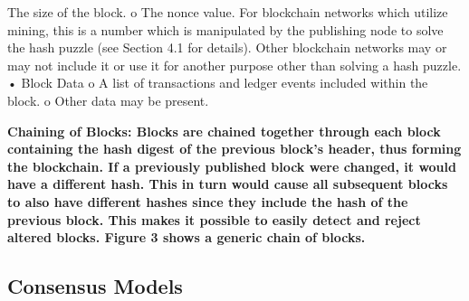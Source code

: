 The size of the block.
o The nonce value. For blockchain networks which utilize mining, this is a number
which is manipulated by the publishing node to solve the hash puzzle (see Section
4.1 for details). Other blockchain networks may or may not include it or use it for
another purpose other than solving a hash puzzle.
• Block Data
o A list of transactions and ledger events included within the block.
o Other data may be present.

\noindent \bf{Chaining of Blocks:} Blocks are chained together through each block containing the hash digest of the previous block’s header, thus forming the
blockchain. If a previously published block were changed, it would have a different hash. This in turn would cause all subsequent
blocks to also have different hashes since they include the hash of the previous block. This makes it possible to easily detect and reject
altered blocks. Figure 3 shows a generic chain of blocks.

\subsection{Consensus Models}
